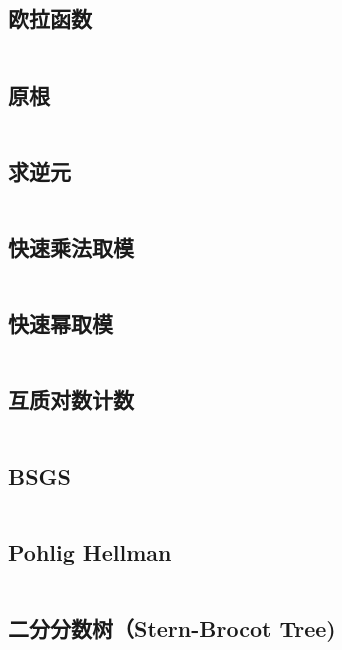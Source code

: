 \inputminted{cpp}{code/exCRT.cc}

\subsection{欧拉函数} 

\inputminted{cpp}{code/EulerPhi.cc}

\subsection{原根} 

\inputminted{cpp}{code/原根.cc}

\subsection{求逆元} 

\inputminted{cpp}{code/inv.cc}

\subsection{快速乘法取模} 

\inputminted{cpp}{code/mul.cc}

\subsection{快速幂取模} 

\inputminted{cpp}{code/powMod.cc}

\subsection{互质对数计数} 

\inputminted{cpp}{code/NumofCo-prime.cc}

\subsection{BSGS} 

\inputminted{cpp}{code/Bsgs.cc}

\subsection{Pohlig Hellman} 

\inputminted{cpp}{code/pohlig_hellman.cc}

\subsection{二分分数树（Stern-Brocot Tree)} 

